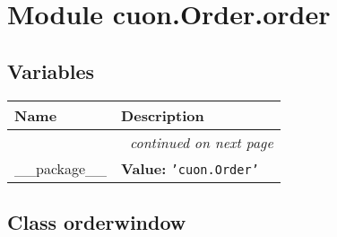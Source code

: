 %
%
%


\section{Module cuon.Order.order}

    \label{cuon:Order:order}


  \subsection{Variables}

    \vspace{-1cm}
\hspace{\varindent}\begin{longtable}{|p{\varnamewidth}|p{\vardescrwidth}|l}
\cline{1-2}
\cline{1-2} \centering \textbf{Name} & \centering \textbf{Description}& \\
\cline{1-2}
\endhead\cline{1-2}\multicolumn{3}{r}{\small\textit{continued on next page}}\\\endfoot\cline{1-2}
\endlastfoot\raggedright \_\-\_\-p\-a\-c\-k\-a\-g\-e\-\_\-\_\- & \raggedright \textbf{Value:} 
{\tt \texttt{'}\texttt{cuon.Order}\texttt{'}}&\\
\cline{1-2}
\end{longtable}



\subsection{Class orderwindow}

